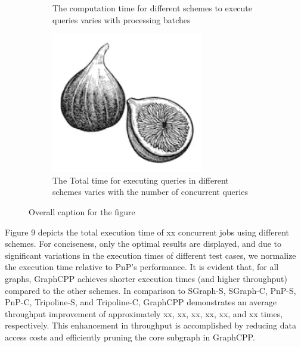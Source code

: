 \documentclass[lettersize,journal]{IEEEtran} %
\begin{document}
\begin{figure}[!t]
\begin{subfigure}{0.3\columnwidth}
      \caption{The computation time for different schemes to execute queries varies with processing batches}
      \label{fig:subfig5}
    \end{subfigure}
    \hfill
    \begin{subfigure}{0.3\columnwidth}
      \includegraphics[width=\linewidth]{fig1.png}
      \caption{The Total time for executing queries in different schemes varies with the number of concurrent queries}
      \label{fig:subfig6}
    \end{subfigure}
  
    \caption{Overall caption for the figure}
    \label{fig:overall}
  \end{figure}
  

Figure 9 depicts the total execution time of xx concurrent jobs using different schemes. For conciseness, only the optimal results are displayed, and due to significant variations in the execution times of different test cases, we normalize the execution time relative to PnP's performance. It is evident that, for all graphs, GraphCPP achieves shorter execution times (and higher throughput) compared to the other schemes. In comparison to SGraph-S, SGraph-C, PnP-S, PnP-C, Tripoline-S, and Tripoline-C, GraphCPP demonstrates an average throughput improvement of approximately xx, xx, xx, xx, xx, and xx times, respectively. This enhancement in throughput is accomplished by reducing data access costs and efficiently pruning the core subgraph in GraphCPP.
\end{document}
